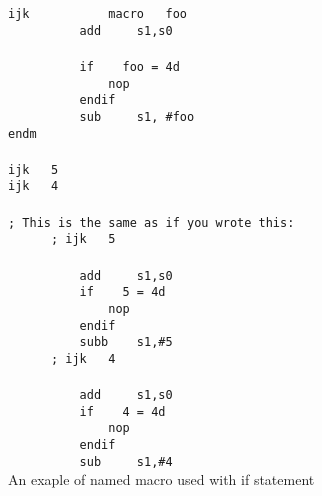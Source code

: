         {
            \usecodefont
            \verb'ijk           macro   foo'\\
            \verb'          add     s1,s0'\\
            \verb''\\
            \verb'          if    foo = 4d'\\
            \verb'              nop'\\
            \verb'          endif'\\
            \verb'          sub     s1, #foo'\\
            \verb'endm'\\\\
            \verb'ijk   5'\\
            \verb'ijk   4'\\\\
            \verb'; This is the same as if you wrote this:'\\
            \verb'      ; ijk   5'\\\\
            \verb'          add     s1,s0'\\
            \verb'          if    5 = 4d'\\
            \verb'              nop'\\
            \verb'          endif'\\
            \verb'          subb    s1,#5'\\
            \verb'      ; ijk   4'\\\\
            \verb'          add     s1,s0'\\
            \verb'          if    4 = 4d'\\
            \verb'              nop'\\
            \verb'          endif'\\
            \verb'          sub     s1,#4'\\
        }
        An exaple of named macro used with if statement


